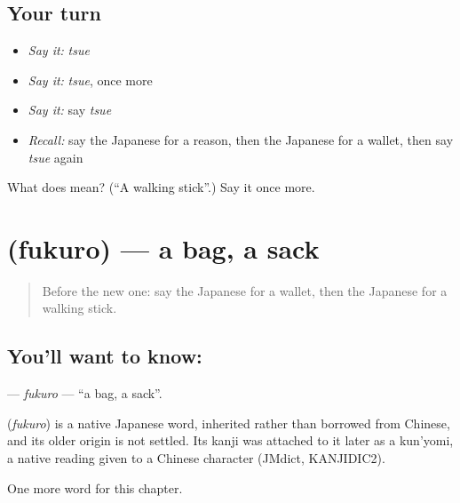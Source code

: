 \subsection*{Your turn}
\begin{itemize}
\raggedright
  \item \emph{Say it:} \emph{tsue}
  \item \emph{Say it:} \emph{tsue}, once more
  \item \emph{Say it:} say \emph{tsue}
  \item \emph{Recall:} say the Japanese for a reason, then the Japanese for a wallet, then say \emph{tsue} again
\end{itemize}

\begin{tcolorbox}[breakable,colback=teal!4,colframe=teal!35!black,title={Before you move on}]
What does  mean? (\textquotedblleft{}A walking stick\textquotedblright{}.) Say it once more.
\end{tcolorbox}
\section[\texorpdfstring{\ja{ふくろ} (fukuro)}{ふくろ (fukuro)}]{ (fukuro) — a bag, a sack}

\label{lesson:JA-C99-fukuro}



\begin{quote}
Before the new one: say the Japanese for a wallet, then the Japanese for a walking stick.
\end{quote}

\subsection*{You'll want to know: }
\textbf{} — \emph{fukuro} — \textquotedblleft{}a bag, a sack\textquotedblright{}.

\begin{cousinweb}
\textbf{} (\emph{fukuro}) is a native Japanese word, inherited rather than borrowed from Chinese, and its older origin is not settled. Its kanji was attached to it later as a kun'yomi, a native reading given to a Chinese character (JMdict, KANJIDIC2).
\end{cousinweb}

\begin{grammarlens}[title={What you've built}]
One more word for this chapter.
\end{grammarlens}

